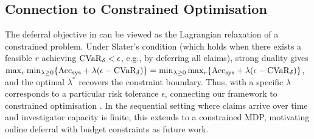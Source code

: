 \subsection{Connection to Constrained Optimisation}
\label{sec:cmdp}

The deferral objective in  can be viewed as the Lagrangian relaxation of a constrained problem. Under Slater's condition (which holds when there exists a feasible $r$ achieving $\mathrm{CVaR}_\delta < \epsilon$, e.g., by deferring all claims), strong duality gives $\max_r \min_{\lambda \geq 0} \{\mathrm{Acc}_{\mathrm{sys}} + \lambda(\epsilon - \mathrm{CVaR}_\delta)\} = \min_{\lambda \geq 0} \max_r \{\mathrm{Acc}_{\mathrm{sys}} + \lambda(\epsilon - \mathrm{CVaR}_\delta)\}$, and the optimal $\lambda^*$ recovers the constraint boundary. Thus,  with a specific $\lambda$ corresponds to a particular risk tolerance $\epsilon$, connecting our framework to constrained optimisation \citep{altman1999constrained}. In the sequential setting where claims arrive over time and investigator capacity is finite, this extends to a constrained MDP, motivating online deferral with budget constraints as future work.
